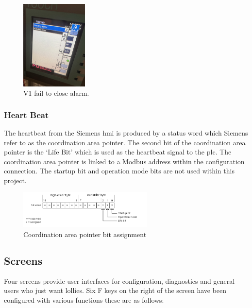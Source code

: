         \begin{figure}[H]
            \centering
            \includegraphics[width = 0.3\textwidth]{2_images/hmiAlarm}
            \caption{V1 fail to close alarm.}
            \label{fig:hmiAlarm}
        \end{figure}  
            
        \subsubsection{Heart Beat}
            The heartbeat from the Siemens \acrshort{hmi} is produced by a status word which Siemens refer to as the coordination area pointer. The second bit of the coordination area pointer is the `Life Bit' which is used as the heartbeat signal to the \acrshort{plc}. The coordination area pointer is linked to a Modbus address within the configuration connection.
            The startup bit and operation mode bits are not used within this project. 

        \begin{figure}[H]
            \centering
            \includegraphics[width = 0.6\textwidth]{2_images/hmiCoordination}
            \caption{Coordination area pointer bit assignment\cite{tiaManual}}
            \label{fig:hmiCoordination}
        \end{figure} 
            

    \subsection{Screens} \label{sec:hmiScreens}
        Four screens provide user interfaces for configuration, diagnostics and general users who just want lollies. Six F keys on the right of the screen have been configured with various functions these are as follows:

